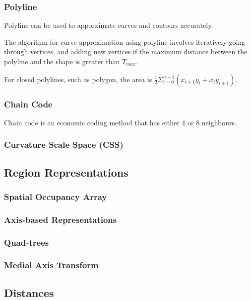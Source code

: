 \documentclass{article}
\begin{document}
\begin{multicols}{2}
 \subsubsection{Polyline}

  Polyline can be used to apporximate curves and contours accurately.
  
  The algorithm for curve approximation using polyline involves iteratively going through vertices, and adding new vertices if the maximum distance between the polyline and the shape is greater than $T_{max}$.

  For closed polylines, such as polygon, the area is $\frac{1}{2}\Sigma_{i=0}^{n-1}(x_{i+1}y_i + x_iy_{i+1})$.

 \subsubsection{Chain Code}

  Chain code is an economic coding method that has either 4 or 8 neighbours.

  

 \subsubsection{Curvature Scale Space (CSS)}

 \subsection{Region Representations}
 \subsubsection{Spatial Occupancy Array}
 \subsubsection{Axis-based Representations}
 \subsubsection{Quad-trees}
 \subsubsection{Medial Axis Transform}


\subsection{Distances}

\end{multicols}
\end{document}
